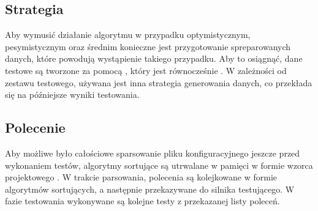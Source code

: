 \begin{figure}[H]
	\centering
	
\end{figure}

\subsection{Strategia}
Aby wymusić działanie algorytmu w przypadku optymistycznym, pesymistycznym oraz średnim konieczne jest przygotowanie
spreparowanych danych, które powodują wystąpienie takiego przypadku. Aby to osiągnąć, dane testowe są tworzone za pomocą , który jest równocześnie . W zależności od zestawu testowego, używana jest inna strategia generowania danych, co przekłada się na późniejsze wyniki testowania.

\begin{figure}[H]
	\centering
	
\end{figure}

\subsection{Polecenie}
Aby możliwe było całościowe sparsowanie pliku konfiguracyjnego jeszcze przed wykonaniem testów, algorytmy sortujące są utrwalane w pamięci w formie wzorca projektowego . W trakcie parsowania, polecenia są kolejkowane w formie algorytmów sortujących, a następnie przekazywane do silnika testującego. W fazie testowania wykonywane są kolejne testy z przekazanej listy poleceń.

\begin{figure}[H]
	\centering
	
\end{figure}


